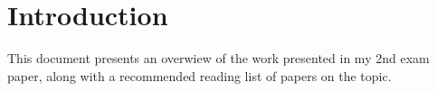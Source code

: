 \documentclass[
10pt, %
a4paper, %
oneside, %
headinclude,footinclude, %
BCOR5mm, %
]{scrartcl}
\title{\normalfont\spacedallcaps{Reservoir Computing}} %
\author{\spacedlowsmallcaps{by Felix Grezes*}} %
\date{2014} %
\begin{document}

\renewcommand{\sectionmark}[1]{\markright{\spacedlowsmallcaps{#1}}} %
\lehead{\mbox{\llap{\small\thepage\kern1em\color{halfgray} \vline}\color{halfgray}\hspace{0.5em}\rightmark\hfil}} %

\pagestyle{scrheadings} %


\maketitle %

\setcounter{tocdepth}{2} %






\section{Introduction}
This document presents an overwiew of the work presented in my 2nd exam paper, along with a recommended reading list of papers on the topic.



\end{document}
